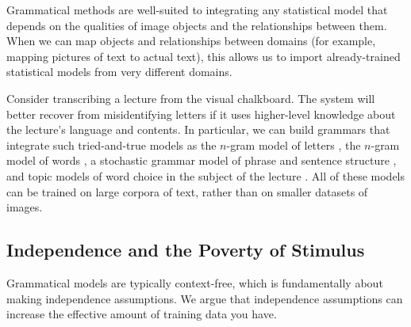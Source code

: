 Grammatical methods are well-suited to integrating any statistical
model that depends on the qualities of image objects and the
relationships between them. When we can map objects and relationships
between domains (for example, mapping pictures of text to actual
text), this allows us to import already-trained statistical models
from very different domains.

Consider transcribing a lecture from the visual chalkboard. The system
will better recover from misidentifying letters if it uses
higher-level knowledge about the lecture's language and contents. In
particular, we can build grammars that integrate such tried-and-true
models as the $n$-gram model of letters \cite{manning-schutze}, the
$n$-gram model of words \cite{manning-schutze}, a stochastic grammar
model of phrase and sentence structure \cite{manning-schutze}, and
topic models of word choice in the subject of the lecture
\cite{lda}. All of these models can be trained on large corpora of
text, rather than on smaller datasets of images.



\subsection{Independence and the Poverty of Stimulus}

Grammatical models are typically context-free, which is fundamentally
about making independence assumptions. We argue that independence
assumptions can increase the effective amount of training data you
have.

